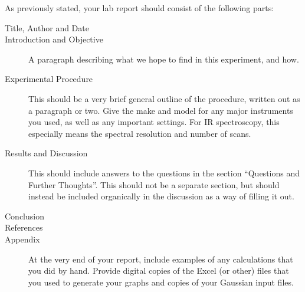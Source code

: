 As previously stated, your lab report should consist of the following parts:
\begin{description}
	\item[Title, Author and Date]
	\item[Introduction and Objective] A paragraph describing what we hope to find in this experiment, and how.
	\item[Experimental Procedure] This should be a very brief general outline of the procedure, written out as a paragraph or two. Give the make and model for any major instruments you used, as well as any important settings. For IR spectroscopy, this especially means the spectral resolution and number of scans.
	\item[Results and Discussion] This should include answers to the questions in the section ``Questions and Further Thoughts''. This should not be a separate section, but should instead be included organically in the discussion as a way of filling it out.
	\item[Conclusion]
	\item[References]
	\item[Appendix] At the very end of your report, include examples of any calculations that you did by hand. 
	Provide digital copies of the Excel (or other) files that you used to generate your graphs and copies of your Gaussian input files.
\end{description}
